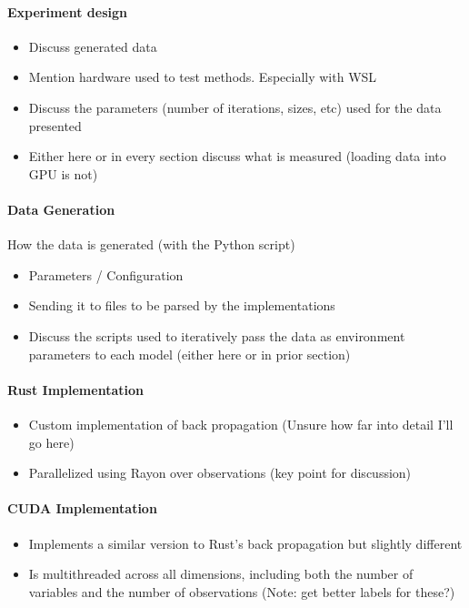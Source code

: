 \documentclass[12pt]{article}
\begin{document}
\paragraph{Experiment design}

\begin{itemize}
	\item Discuss generated data
	\item Mention hardware used to test methods. Especially with WSL
	\item Discuss the parameters (number of iterations, sizes, etc) used for the data presented
	\item Either here or in every section discuss what is measured (loading data into GPU is not)
\end{itemize}

\paragraph{Data Generation}

How the data is generated (with the Python script)
\begin{itemize}
	\item Parameters / Configuration
	\item Sending it to files to be parsed by the implementations
	\item Discuss the scripts used to iteratively pass the data as environment parameters to each model (either here or in prior section)
\end{itemize}

\paragraph{Rust Implementation}

\begin{itemize}
	\item Custom implementation of back propagation (Unsure how far into detail I'll go here)
	\item Parallelized using Rayon \cite{lib_rayon} over observations (key point for discussion)
\end{itemize}

\paragraph{CUDA Implementation}


\begin{itemize}
	\item Implements a similar version to Rust's back propagation but slightly different
	\item Is multithreaded across all dimensions, including both the number of variables and the number of observations (Note: get better labels for these?)
\end{itemize}
\end{document}
